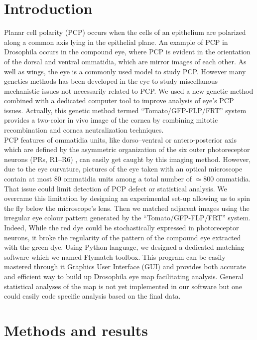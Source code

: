 \documentclass{article}
\begin{document}
\section{Introduction}
Planar cell polarity (PCP) occurs when the cells of an epithelium are polarized along a common axis lying in the epithelial plane. An example of PCP in Drosophila occurs in the compound eye, where PCP is evident in the orientation of the dorsal and ventral ommatidia, which are mirror images of each other. As well as wings, the eye is a commonly used model to study PCP\cite{ref7}. However many genetics methods has been developed in the eye to study miscellanous mechanistic issues not necessarily related to PCP. We used a new genetic method combined with a dedicated computer tool to improve analysis of eye's PCP issues. Actually, this genetic method termed “Tomato/GFP-FLP/FRT” system provides a two-color in vivo image of the cornea by combining
mitotic recombination and cornea neutralization techniques\cite{ref4}. \\
PCP features of ommatidia units, like dorso–ventral or antero-posterior axis which are defined by the asymmetric organization of the six outer photoreceptor neurons (PRs, R1–R6) \cite{ref4}, can easily get caught by this imaging method.
However, due to the eye curvature, pictures of the eye taken with an optical microscope contain at most 80 ommatidia units among  a total number of $\simeq 800$ ommatidia. That issue could limit detection of PCP defect or statistical analysis. We overcame this limitation by designing an experimental set-up allowing us to spin the fly below the microscope's lens. Then we matched adjacent images using the irregular eye colour pattern generated by the “Tomato/GFP-FLP/FRT” system. Indeed, While the red dye could be stochastically expressed in photoreceptor neurons, it broke the regularity of the pattern of the compound eye extracted with the green dye. Using Python language, we designed a dedicated matching software which we named Flymatch toolbox. This program can be easily mastered through it Graphics User Interface (GUI) and provides both accurate and efficient way to build up Drosophila eye map facilitating analysis. General statistical analyses of the map is not yet implemented in our software but one could easily code specific analysis based on the final data.

\newpage
\section{Methods and results}
\end{document}
